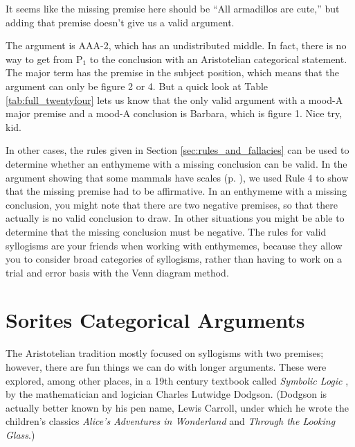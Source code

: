 \begin{kormanize}
\end{kormanize}

It seems like the missing premise here should be ``All armadillos are cute,''  but adding that premise doesn't give us a valid argument.

\begin{kormanize}
\end{kormanize}

The argument is AAA-2, which has an undistributed middle. In fact, there is no way to get from P$_1$ to the conclusion with an Aristotelian categorical statement. The major term has the premise in the subject position, which means that the argument can only be figure 2 or 4. But a quick look at Table \ref{tab:full_twentyfour} lets us know that the only valid argument with a mood-A major premise and a mood-A conclusion is Barbara, which is figure 1. Nice try, kid.

In other cases, the rules given in Section \ref{sec:rules_and_fallacies} can be used to determine whether an enthymeme with a missing conclusion can be valid. In the argument showing that some mammals have scales (p. \pageref{rule_use}), we used Rule 4 to show that the missing premise had to be affirmative. In an enthymeme with a missing conclusion, you might note that there are two negative premises, so that there actually is no valid conclusion to draw. In other situations you might be able to determine that the missing conclusion must be negative. The rules for valid syllogisms are your friends when working with enthymemes, because they allow you to consider broad categories of syllogisms, rather than having to work on a trial and error basis with the Venn diagram method.


\section{Sorites Categorical Arguments}\label{sec:sorites}

The Aristotelian tradition mostly focused on syllogisms with two premises; however, there are fun things we can do with longer arguments. These were explored, among other places, in a 19th century textbook called \textit{Symbolic Logic} \cite{Dodgson1896}, by the mathematician and logician Charles Lutwidge Dodgson. (Dodgson is actually better known by his pen name, Lewis Carroll, under which he wrote the children's classics \textit{Alice's Adventures in Wonderland} and \textit{Through the Looking Glass}.)

